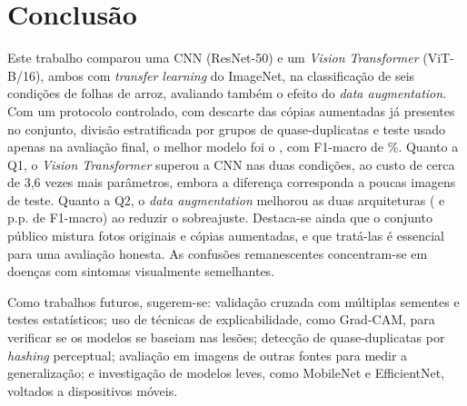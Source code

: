 \documentclass[conference]{IEEEtran}
\begin{document}
\section{Conclusão}\label{sec:conclusao}
Este trabalho comparou uma CNN (ResNet-50) e um \textit{Vision Transformer} (ViT-B/16), ambos com \textit{transfer learning} do ImageNet, na classificação de seis condições de folhas de arroz, avaliando também o efeito do \textit{data augmentation}. Com um protocolo controlado, com descarte das cópias aumentadas já presentes no conjunto, divisão estratificada por grupos de quase-duplicatas e teste usado apenas na avaliação final, o melhor modelo foi o \BestLabel{}, com F1-macro de \BestFOne\%. Quanto a Q1, o \textit{Vision Transformer} superou a CNN nas duas condições, ao custo de cerca de 3,6 vezes mais parâmetros, embora a diferença corresponda a poucas imagens de teste. Quanto a Q2, o \textit{data augmentation} melhorou as duas arquiteturas (\DeltaAugResNet{} e \DeltaAugViT{} p.p. de F1-macro) ao reduzir o sobreajuste. Destaca-se ainda que o conjunto público mistura fotos originais e cópias aumentadas, e que tratá-las é essencial para uma avaliação honesta. As confusões remanescentes concentram-se em doenças com sintomas visualmente semelhantes.

Como trabalhos futuros, sugerem-se: validação cruzada com múltiplas sementes e testes estatísticos; uso de técnicas de explicabilidade, como Grad-CAM, para verificar se os modelos se baseiam nas lesões; detecção de quase-duplicatas por \textit{hashing} perceptual; avaliação em imagens de outras fontes para medir a generalização; e investigação de modelos leves, como MobileNet e EfficientNet, voltados a dispositivos móveis.



\end{document}
